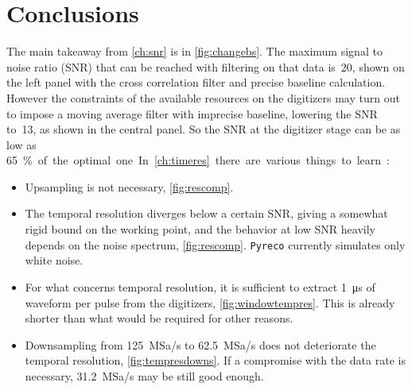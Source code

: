 \chapter{Conclusions}
\label{ch:end}


The main takeaway from \autoref{ch:snr} is in \autoref{fig:changebs}. The
maximum signal to noise ratio (SNR) that can be reached with filtering on that
data is~20, shown on the left panel with the cross correlation filter and
precise baseline calculation. However the constraints of the available
resources on the digitizers may turn out to impose a moving average filter with
imprecise baseline, lowering the SNR to~13, as shown in the central panel. So
the SNR at the digitizer stage can be as low as \SI{65}\% of the optimal one.

In \autoref{ch:timeres} there are various things to learn:

\begin{itemize}
    
    \item Upsampling is not necessary, \autoref{fig:rescomp}.
    
    \item The temporal resolution diverges below a certain SNR, giving a
    somewhat rigid bound on the working point, and the behavior at low SNR
    heavily depends on the noise spectrum, \autoref{fig:rescomp}.
    \texttt{Pyreco} currently simulates only white noise.
    
    \item For what concerns temporal resolution, it is sufficient to extract
    \SI{1}{\micro s} of waveform per pulse from the digitizers,
    \autoref{fig:windowtempres}. This is already shorter than what would be
    required for other reasons.
    
    \item Downsampling from \SI{125}{MSa/s} to \SI{62.5}{MSa/s} does not
    deteriorate the temporal resolution, \autoref{fig:tempresdowns}. If a
    compromise with the data rate is necessary, \SI{31.2}{MSa/s} may be still
    good enough.
    
\end{itemize}

